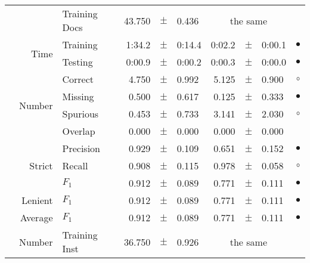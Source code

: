 \begin{longtable}{|r|r|l||rcl|rcl|c|}
\cline{3-10} &                             &   Training Docs &      43.750 &  $\pm$  &       0.436 &    \multicolumn{3}{c|}{the same}         &  \\
\cline{2-10} & \multirow{2}{*}{      Time} &        Training &      1:34.2 &  $\pm$  &      0:14.4 &      0:02.2 &  $\pm$  &      0:00.1 & $\bullet$ \\
\cline{3-10} &                             &         Testing &      0:00.9 &  $\pm$  &      0:00.2 &      0:00.3 &  $\pm$  &      0:00.0 & $\bullet$ \\
\hline
\pagebreak
\hline
\hline
\multirow{11}{*}{\begin{sideways}start\end{sideways} }
             & \multirow{4}{*}{    Number} &         Correct &       4.750 &  $\pm$  &       0.992 &       5.125 &  $\pm$  &       0.900 & $\circ$ \\
\cline{3-10} &                             &         Missing &       0.500 &  $\pm$  &       0.617 &       0.125 &  $\pm$  &       0.333 & $\bullet$ \\
\cline{3-10} &                             &        Spurious &       0.453 &  $\pm$  &       0.733 &       3.141 &  $\pm$  &       2.030 & $\circ$ \\
\cline{3-10} &                             &         Overlap &       0.000 &  $\pm$  &       0.000 &       0.000 &  $\pm$  &       0.000 &  \\
\cline{2-10} & \multirow{3}{*}{    Strict} &       Precision &       0.929 &  $\pm$  &       0.109 &       0.651 &  $\pm$  &       0.152 & $\bullet$ \\
\cline{3-10} &                             &          Recall &       0.908 &  $\pm$  &       0.115 &       0.978 &  $\pm$  &       0.058 & $\circ$ \\
\cline{3-10} &                             &           $F_1$ &       0.912 &  $\pm$  &       0.089 &       0.771 &  $\pm$  &       0.111 & $\bullet$ \\
\cline{2-10} &                     Lenient &           $F_1$ &       0.912 &  $\pm$  &       0.089 &       0.771 &  $\pm$  &       0.111 & $\bullet$ \\
\cline{2-10} &                     Average &           $F_1$ &       0.912 &  $\pm$  &       0.089 &       0.771 &  $\pm$  &       0.111 & $\bullet$ \\
\cline{2-10} & \multirow{2}{*}{    Number} &   Training Inst &      36.750 &  $\pm$  &       0.926 &    \multicolumn{3}{c|}{the same}         &  \\

\end{longtable}
